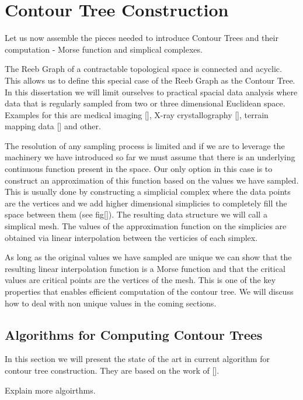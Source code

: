 \chapter{Contour Tree Construction}
\label{chapter3}

Let us now assemble the pieces needed to introduce Contour Trees and their computation - Morse function and simplical complexes.

The Reeb Graph of a contractable topological space is connected and acyclic. This allows us to define this special case of the Reeb Graph as the Contour Tree. In this dissertation we will limit ourselves to practical spacial data analysis where data that is regularly sampled from two or three dimensional Euclidean space. Examples for this are medical imaging [], X-ray crystallography [], terrain mapping data [] and other. 

The resolution of any sampling process is limited and if we are to leverage the machinery we have introduced so far we must assume that there is an underlying continuous function present in the space. Our only option in this case is to construct an approximation of this function based on the values we have sampled. This is usually done by constructing a simplicial complex where the data points are the vertices and we add higher dimensional simplicies to completely fill the space between them (see fig[]). The resulting data structure we will call a simplical mesh. The values of the approximation function on the simplicies are obtained via linear interpolation between the verticies of each simplex. 

As long as the original values we have sampled are unique we can show that the resulting linear interpolation function is a Morse function and that the critical values are critical points are the vertices of the mesh. This is one of the key properties that enables efficient computation of the contour tree. We will discuss how to deal with non unique values in the coming sections.

\section{Algorithms for Computing Contour Trees}
In this section we will present the state of the art in current algorithm for contour tree construction. They are based on the work of []. 

Explain more algoirthms.

